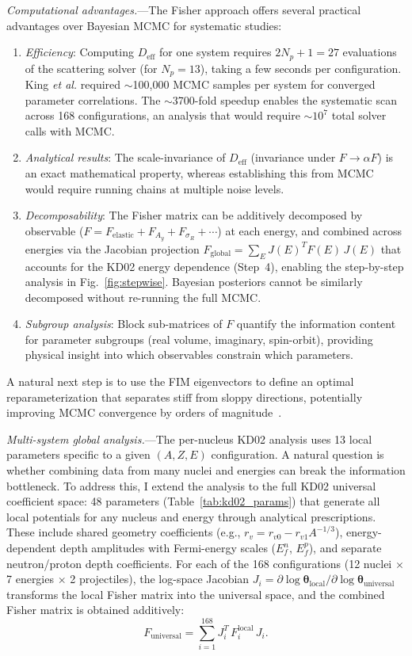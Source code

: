 \documentclass[aps,prl,reprint,superscriptaddress,showpacs,floatfix]{revtex4-2}
\begin{document}
\textit{Computational advantages.}---The Fisher approach offers several practical advantages over Bayesian MCMC for systematic studies:
\begin{enumerate}
\item \emph{Efficiency}: Computing $D_\mathrm{eff}$ for one system requires $2N_p + 1 = 27$ evaluations of the scattering solver (for $N_p = 13$), taking a few seconds per configuration. King \textit{et al.} required $\sim$100,000 MCMC samples per system for converged parameter correlations. The $\sim$3700-fold speedup enables the systematic scan across 168 configurations, an analysis that would require $\sim$$10^7$ total solver calls with MCMC.
\item \emph{Analytical results}: The scale-invariance of $D_\mathrm{eff}$ (invariance under $F \to \alpha F$) is an exact mathematical property, whereas establishing this from MCMC would require running chains at multiple noise levels.
\item \emph{Decomposability}: The Fisher matrix can be additively decomposed by observable ($F = F_\mathrm{elastic} + F_{A_y} + F_{\sigma_R} + \cdots$) at each energy, and combined across energies via the Jacobian projection $F_\mathrm{global} = \sum_E J(E)^T F(E)\, J(E)$ that accounts for the KD02 energy dependence (Step~4), enabling the step-by-step analysis in Fig.~\ref{fig:stepwise}. Bayesian posteriors cannot be similarly decomposed without re-running the full MCMC.
\item \emph{Subgroup analysis}: Block sub-matrices of $F$ quantify the information content for parameter subgroups (real volume, imaginary, spin-orbit), providing physical insight into which observables constrain which parameters.
\end{enumerate}

A natural next step is to use the FIM eigenvectors to define an optimal reparameterization that separates stiff from sloppy directions, potentially improving MCMC convergence by orders of magnitude~\cite{Catacora2021}.

\textit{Multi-system global analysis.}---The per-nucleus KD02 analysis uses 13 local parameters specific to a given $(A, Z, E)$ configuration. A natural question is whether combining data from many nuclei and energies can break the information bottleneck. To address this, I extend the analysis to the full KD02 universal coefficient space: 48 parameters (Table~\ref{tab:kd02_params}) that generate all local potentials for any nucleus and energy through analytical prescriptions. These include shared geometry coefficients (e.g., $r_v = r_{v0} - r_{v1} A^{-1/3}$), energy-dependent depth amplitudes with Fermi-energy scales ($E_{f}^{n}$, $E_{f}^{p}$), and separate neutron/proton depth coefficients. For each of the 168 configurations (12 nuclei $\times$ 7 energies $\times$ 2 projectiles), the log-space Jacobian $J_i = \partial \log \boldsymbol{\theta}_\mathrm{local} / \partial \log \boldsymbol{\theta}_\mathrm{universal}$ transforms the local Fisher matrix into the universal space, and the combined Fisher matrix is obtained additively:
\begin{equation}
F_\mathrm{universal} = \sum_{i=1}^{168} J_i^T \, F_i^\mathrm{local} \, J_i.
\end{equation}
\end{document}
